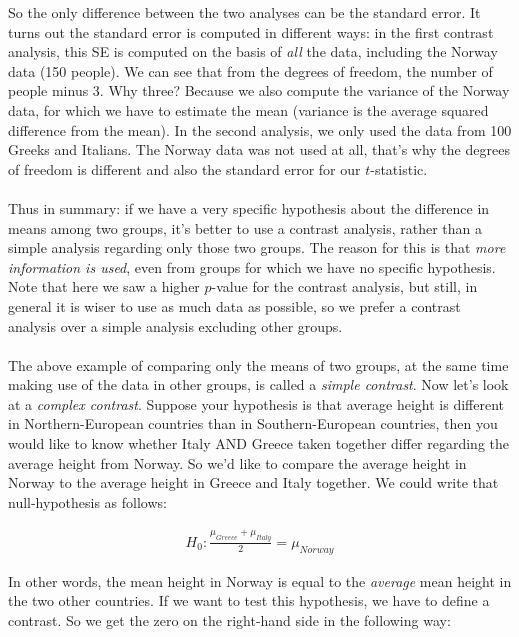 \documentclass[]{report}\usepackage[]{graphicx}\usepackage[]{color}
\begin{document}
So the only difference between the two analyses can be the standard error. It turns out the standard error is computed in different ways: in the first contrast analysis, this SE is computed on the basis of \textit{all} the data, including the Norway data (150 people). We can see that from the degrees of freedom, the number of people minus 3. Why three? Because we also compute the variance of the Norway data, for which we have to estimate the mean (variance is the average squared difference from the mean). In the second analysis, we only used the data from 100 Greeks and Italians. The Norway data was not used at all, that's why the degrees of freedom is different and also the standard error for our $t$-statistic. 
\\
\\
Thus in summary: if we have a very specific hypothesis about the difference in means among two groups, it's better to use a contrast analysis, rather than a simple analysis regarding only those two groups. The reason for this is that \textit{more information is used}, even from groups for which we have no specific hypothesis. 
\\
Note that here we saw a higher $p$-value for the contrast analysis, but still, in general it is wiser to use as much data as possible, so we prefer a contrast analysis over a simple analysis excluding other groups.
\\
\\
The above example of comparing only the means of two groups, at the same time making use of the data in other groups, is called a \textit{simple contrast}. Now let's look at a \textit{complex contrast}. Suppose your hypothesis is that average height is different in Northern-European countries than in Southern-European countries, then you would like to know whether Italy AND Greece taken together differ regarding the average height from Norway. So we'd like to compare the average height in Norway to the average height in Greece and Italy together. We could write that null-hypothesis as follows:

\begin{eqnarray}
H_0 : \frac{\mu_{Greece}+ \mu_{Italy}}{2} = \mu_{Norway}
\end{eqnarray}


In other words, the mean height in Norway is equal to the \textit{average} mean height in the two other countries. If we want to test this hypothesis, we have to define a contrast. So we get the zero on the right-hand side in the following way:
\end{document}
